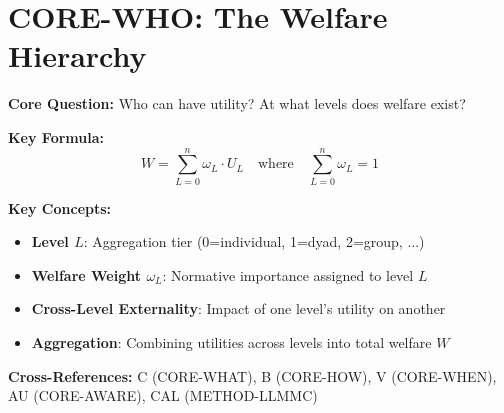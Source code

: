 
\chapter{CORE-WHO: The Welfare Hierarchy}
\label{app:core-who}

\begin{abstract}
This appendix answers the first fundamental question of the Evidence-Based Framework:
\textit{``Who can have utility?''} We establish that welfare exists at multiple
aggregation levels $L \in \{0, 1, 2, \ldots, n\}$, from individual ($L=0$) through
dyadic ($L=1$), group ($L=2$), organizational ($L=3$), to societal ($L=n$) levels.
The axiom system SRL-1 through SRL-8 formalizes the conditions for well-defined
cross-level aggregation, ensuring Pareto consistency and addressing the problem
of double-counting. This hierarchy is foundational: WHAT (C), HOW (B), and WHEN (V)
all presuppose answers to WHO.
\end{abstract}


\begin{tcolorbox}[colback=blue!5!white, colframe=blue!75!black,
    title=Quick Reference: CORE-WHO]

\textbf{Core Question:} Who can have utility? At what levels does welfare exist?

\textbf{Key Formula:}
\begin{equation}
W = \sum_{L=0}^{n} \omega_L \cdot U_L \quad \text{where} \quad \sum_{L=0}^{n} \omega_L = 1
\label{eq:who-aggregation}
\end{equation}

\textbf{Key Concepts:}
\begin{itemize}[nosep]
\item \textbf{Level $L$}: Aggregation tier (0=individual, 1=dyad, 2=group, ...)
\item \textbf{Welfare Weight $\omega_L$}: Normative importance assigned to level $L$
\item \textbf{Cross-Level Externality}: Impact of one level's utility on another
\item \textbf{Aggregation}: Combining utilities across levels into total welfare $W$
\end{itemize}

\textbf{Cross-References:}
C (CORE-WHAT), B (CORE-HOW), V (CORE-WHEN), AU (CORE-AWARE), CAL (METHOD-LLMMC)

\end{tcolorbox}



